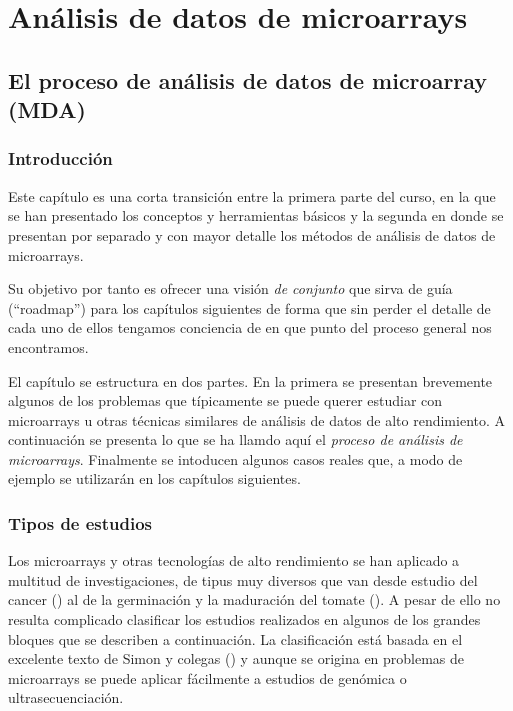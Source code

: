 

\part{An\'alisis de datos de microarrays}

\chapter{El proceso de an\'alisis de datos de microarray (MDA)\label{MDAProcess}}

\section{Introducci\'on}

Este cap\'itulo es una corta transici\'on entre la primera parte del curso, en la que se han presentado los conceptos y herramientas b\'asicos y la segunda en donde se presentan por separado y con mayor detalle los m\'etodos de an\'alisis de datos de microarrays.

Su objetivo por tanto es ofrecer una visi\'on \emph{de conjunto} que sirva de gu\'ia (``roadmap'') para los cap\'itulos siguientes de forma que sin perder el detalle de cada uno de ellos tengamos conciencia de en que punto del proceso general nos encontramos.

El cap\'itulo se estructura en dos partes. En la primera se presentan brevemente algunos de los problemas que t\'ipicamente se puede querer estudiar con microarrays u otras t\'ecnicas similares de an\'alisis de datos de alto rendimiento. A continuaci\'on se presenta lo que se ha llamdo aqu\'i el \emph{proceso de an\'alisis de microarrays}. Finalmente se intoducen algunos casos reales que, a modo de ejemplo se utilizar\'an en los cap\'itulos siguientes.

\section{Tipos de estudios}

Los microarrays y otras tecnolog\'ias de alto rendimiento se han aplicado a multitud de investigaciones, de tipus muy diversos que van desde estudio del cancer  (\cite{alizadeh:2000, Golub:1999, vantveer:2002}) al de la germinaci\'on y la maduraci\'on del tomate (\cite{Moore:2002}). A pesar de ello no resulta complicado clasificar los estudios realizados en algunos de los grandes bloques que se describen a continuaci\'on. La clasificaci\'on est\'a basada en el excelente texto de Simon y colegas (\cite{Simon:2003}) y aunque se origina en problemas de microarrays se puede aplicar f\'acilmente a estudios de gen\'omica o ultrasecuenciaci\'on.


